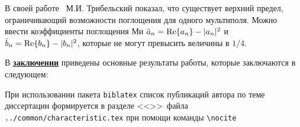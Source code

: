 В своей работе~\cite{Tribelsky-2011} М.И. Трибельский показал, что
существует верхний предел, ограничивающий возможности поглощения для
одного мультиполя. Можно ввести коэффициенты поглощения Ми $\tilde{a}_n=
{\rm Re}\{a_n\} - |a_n|^2 $ и $\tilde{b}_n= {\rm Re}\{b_n\} -
|b_n|^2 $, которые не могут превысить величины в $1/4$.



В \underline{\textbf{заключении}} приведены основные результаты
работы, которые заключаются в следующем: 


При использовании пакета \verb!biblatex! список публикаций автора по теме
диссертации формируется в разделе <<\publications>>\ файла
\verb!../common/characteristic.tex!  при помощи команды \verb!\nocite! 


